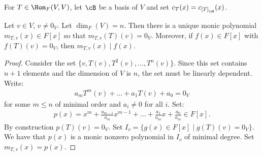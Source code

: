     \begin{definition}
        For $T \in \Hom_F(V,V)$, let $\cB$ be a basis of $V$ and set $c_T(x) = c_{\left[T\right]_\cB}(x)$.
    \end{definition}

    \begin{theorem}
        Let $v \in V$, $v\neq 0_V$. Let $\dim_F(V) = n$. Then there is a unique monic polynomial $m_{T,v}(x) \in F[x]$ so that $m_{T,v}(T)(v) = 0_V$. Moreover, if $f(x) \in F[x]$ with $f(T)(v) = 0_V$, then $m_{T,v}(x) \mid f(x)$.
    \end{theorem}
        \begin{proof}
            Consider the set $\{v,T(v),T^2(v),...,T^n(v)\}$. Since this set contains $n+1$ elements and the dimension of $V$ is $n$, the set must be linearly dependent. Write:
                \begin{equation*}
                \begin{split}
                    a_mT^m(v) + ... + a_1T(v) + a_0 = 0_V
                \end{split}
                \end{equation*}
            for some $m \leq n$ of minimal order and $a_i \neq 0$ for all $i$. Set:
                \begin{equation*}
                \begin{split}
                    p(x) = x^m + \frac{a_{m-1}}{a_m}x^{m-1} + ... + \frac{a_{1}}{a_m}x + \frac{a_{0}}{a_m} \in F[x].
                \end{split}
                \end{equation*}
            By construction $p(T)(v) = 0_V$. Set $I_v = \{g(x) \in F[x] \mid g(T)(v) = 0_V \}$. We have that $p(x)$ is a monic nonzero polynomial in $I_v$ of minimal degree. Set $m_{T,v}(x) = p(x)$.


\end{proof}
